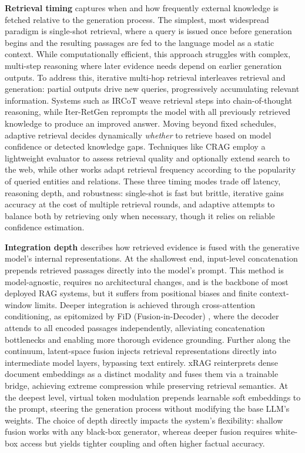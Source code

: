 \documentclass[11pt,a4paper]{article}
\begin{document}
\textbf{Retrieval timing} captures when and how frequently external knowledge is fetched relative to the generation process. The simplest, most widespread paradigm is single-shot retrieval, where a query is issued once before generation begins and the resulting passages are fed to the language model as a static context. While computationally efficient, this approach struggles with complex, multi-step reasoning where later evidence needs depend on earlier generation outputs. To address this, iterative multi-hop retrieval interleaves retrieval and generation: partial outputs drive new queries, progressively accumulating relevant information. Systems such as IRCoT \cite{arxiv:2212.10509v2} weave retrieval steps into chain-of-thought reasoning, while Iter-RetGen \cite{arxiv:2305.15294v2} reprompts the model with all previously retrieved knowledge to produce an improved answer. Moving beyond fixed schedules, adaptive retrieval decides dynamically \emph{whether} to retrieve based on model confidence or detected knowledge gaps. Techniques like CRAG \cite{arxiv:2401.15884v2} employ a lightweight evaluator to assess retrieval quality and optionally extend search to the web, while other works \cite{arxiv:2402.13492v3} adapt retrieval frequency according to the popularity of queried entities and relations. These three timing modes trade off latency, reasoning depth, and robustness: single-shot is fast but brittle, iterative gains accuracy at the cost of multiple retrieval rounds, and adaptive attempts to balance both by retrieving only when necessary, though it relies on reliable confidence estimation.

\textbf{Integration depth} describes how retrieved evidence is fused with the generative model's internal representations. At the shallowest end, input-level concatenation prepends retrieved passages directly into the model's prompt. This method is model-agnostic, requires no architectural changes, and is the backbone of most deployed RAG systems, but it suffers from positional biases and finite context-window limits. Deeper integration is achieved through cross-attention conditioning, as epitomized by FiD (Fusion-in-Decoder) \cite{arxiv:2209.14290v1}, where the decoder attends to all encoded passages independently, alleviating concatenation bottlenecks and enabling more thorough evidence grounding. Further along the continuum, latent-space fusion injects retrieval representations directly into intermediate model layers, bypassing text entirely. xRAG \cite{arxiv:2405.13792v1} reinterprets dense document embeddings as a distinct modality and fuses them via a trainable bridge, achieving extreme compression while preserving retrieval semantics. At the deepest level, virtual token modulation prepends learnable soft embeddings to the prompt, steering the generation process without modifying the base LLM's weights. The choice of depth directly impacts the system's flexibility: shallow fusion works with any black-box generator, whereas deeper fusion requires white-box access but yields tighter coupling and often higher factual accuracy.
\end{document}
